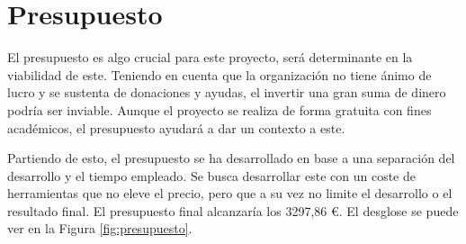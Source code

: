 \section{Presupuesto}

El presupuesto es algo crucial para este proyecto, será determinante en la viabilidad de este. Teniendo en cuenta que la organización no tiene ánimo de lucro y se sustenta de donaciones y ayudas, el invertir una gran suma de dinero podría ser inviable. Aunque el proyecto se realiza de forma gratuita con fines académicos, el presupuesto ayudará a dar un contexto a este.

Partiendo de esto, el presupuesto se ha desarrollado en base a una separación del desarrollo y el tiempo empleado. Se busca desarrollar este con un coste de herramientas que no eleve el precio, pero que a su vez no limite el desarrollo o el resultado final. El presupuesto final alcanzaría los 3297,86 €. El desglose se puede ver en la Figura \ref{fig:presupuesto}.

